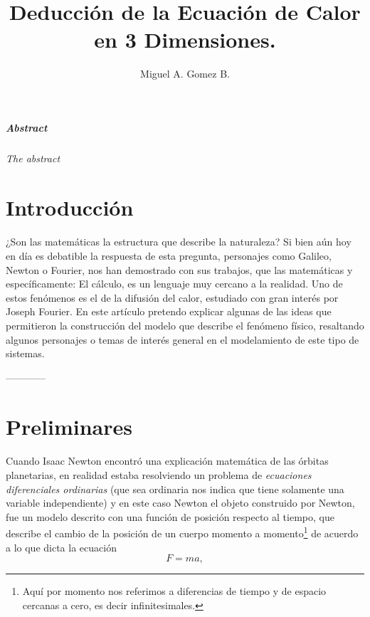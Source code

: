 \documentclass{article}
\title{Deducción de la Ecuación de Calor en 3 Dimensiones.}
\author{Miguel A. Gomez B.}
\begin{document}
\maketitle

\subparagraph{Abstract}\textit{The abstract}

\section*{Introducción}
\paragraph{}¿Son las matemáticas la estructura que describe la naturaleza? Si bien aún hoy en día es debatible la respuesta de esta pregunta, personajes como Galileo, Newton o Fourier, nos han demostrado con sus trabajos, que las matemáticas y específicamente: El cálculo, es un lenguaje muy cercano a la realidad. Uno de estos fenómenos es el de la difusión del calor, estudiado con gran interés por Joseph Fourier. En este artículo pretendo explicar algunas de las ideas que permitieron la construcción del modelo que describe el fenómeno físico, resaltando algunos personajes o temas de interés general en el modelamiento de este tipo de sistemas.
\begin{center}
	------------
\end{center}
\section{Preliminares}
\paragraph{} Cuando Isaac Newton encontró una explicación matemática de las órbitas planetarias, en realidad estaba resolviendo un problema de \textit{ecuaciones diferenciales ordinarias} (que sea ordinaria nos indica que tiene solamente una variable independiente) y en este caso Newton el objeto construido por Newton, fue un modelo descrito con una función de posición respecto al tiempo, que describe el cambio de la posición de un cuerpo momento a momento\footnote{Aquí por momento nos referimos a diferencias de tiempo y de espacio cercanas a cero, es decir infinitesimales.} de acuerdo a lo que dicta la ecuación
$$F=ma,$$
\end{document}
